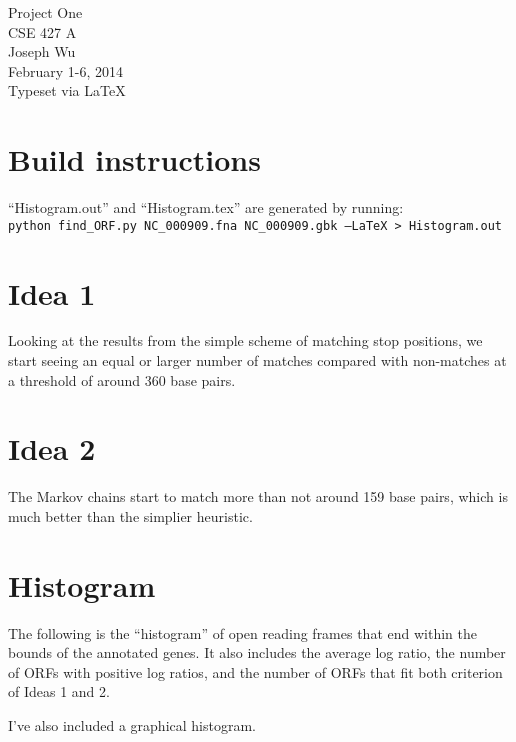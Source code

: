 \documentclass[a4paper, 12pt]{report}
\begin{document}
    \begin{center}
        {\LARGE Project One} \\
        CSE 427 A \\
        Joseph Wu  \\
        February 1-6, 2014 \\
        {\tiny Typeset via \LaTeX}
    \end{center}

\section{Build instructions}
    ``Histogram.out'' and ``Histogram.tex'' are generated by running: \\
    \texttt{python find\_ORF.py NC\_000909.fna NC\_000909.gbk --LaTeX > Histogram.out}

\section{Idea 1}
    Looking at the results from the simple scheme of matching stop positions, 
    we start seeing an equal or larger number of matches compared with non-matches 
        at a threshold of around 360 base pairs.
        
\section{Idea 2}
    The Markov chains start to match more than not around 159 base pairs,
        which is much better than the simplier heuristic.

\section{Histogram}
    The following is the ``histogram'' of open reading frames
    that end within the bounds of the annotated genes.
    It also includes the average log ratio,
        the number of ORFs with positive log ratios, 
        and the number of ORFs that fit both criterion of Ideas 1 and 2.

    I've also included a graphical histogram.
    
    
    
\end{document}
